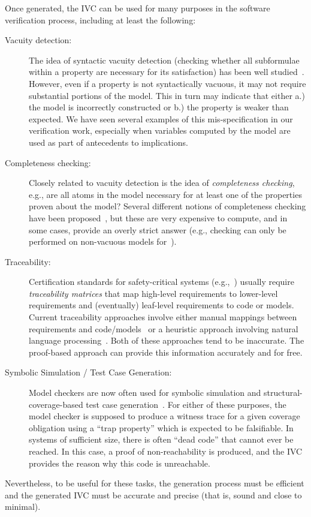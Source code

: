 Once generated, the IVC can be used for many purposes in the software verification process, including at least the following:
\begin{description}
    \item[Vacuity detection:] The idea of syntactic vacuity detection (checking whether all subformulae within a property are necessary for its satisfaction) has been well studied~\cite{Kupferman03:Vacuity}.   However, even if a property is not syntactically vacuous, it may not require substantial portions of the model.  This in turn may indicate that either a.) the model is incorrectly constructed or b.) the property is weaker than expected.  We have seen several examples of this mis-specification in our verification work, especially when variables computed by the model are used as part of antecedents to implications.
    \item[Completeness checking:] Closely related to vacuity detection is the idea of {\em completeness checking}, e.g., are all atoms in the model necessary for at least one of the properties proven about the model?  Several different notions of completeness checking have been proposed~\cite{chockler_coverage_2003, kupferman_theory_2008}, but these are very expensive to compute, and in some cases, provide an overly strict answer (e.g., checking can only be performed on non-vacuous models for~\cite{kupferman_theory_2008}).
    \item[Traceability:] Certification standards for safety-critical systems (e.g.,~\cite{DO178C,MOD:00-55}) usually require {\em traceability matrices} that map high-level requirements to lower-level requirements and (eventually) leaf-level requirements to code or models.  Current traceability approaches involve either manual mappings between requirements and code/models~\cite{SimulinkTraceability} or a heuristic approach involving natural language processing~\cite{Keenan12:Tracelab}.  Both of these approaches tend to be inaccurate.  The proof-based approach can provide this information accurately and for free.
    \item[Symbolic Simulation / Test Case Generation:]  Model checkers are now often used for symbolic simulation and structural-coverage-based test case generation~\cite{SimulinkDesignVerifier,Whalen13:OMCDC}.  For either of these purposes, the model checker is supposed to produce a witness trace for a given coverage obligation using a ``trap property'' which is expected to be falsifiable.  In systems of sufficient size, there is often ``dead code'' that cannot ever be reached.  In this case, a proof of non-reachability is produced, and the IVC provides the reason why this code is unreachable.
\end{description}
\noindent Nevertheless, to be useful for these tasks, the generation
process must be efficient and the generated IVC must be
accurate and precise (that is, sound and close to minimal).

